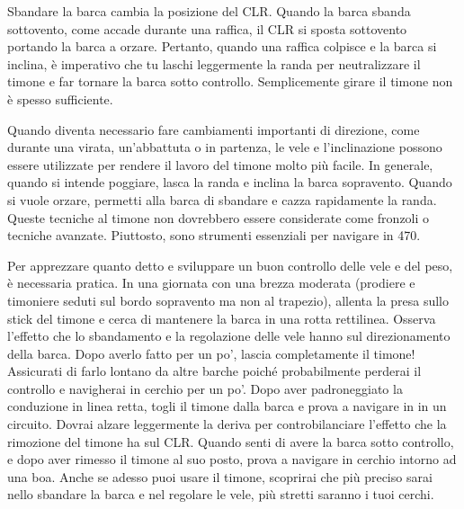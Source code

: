 Sbandare la barca cambia la posizione del CLR. Quando la barca sbanda
sottovento, come accade durante una raffica, il CLR si sposta sottovento
portando la barca a orzare. Pertanto, quando una raffica colpisce e la barca
si inclina, è imperativo che tu laschi leggermente la randa per neutralizzare il
timone e far tornare la barca sotto controllo. Semplicemente girare il timone
non è spesso sufficiente.

Quando diventa necessario fare cambiamenti importanti di
direzione, come durante una virata, un'abbattuta o in partenza,
le vele e l'inclinazione possono essere utilizzate per rendere il lavoro del
timone molto più facile. In generale, quando si intende poggiare, lasca la
randa e inclina la barca sopravento. Quando si vuole orzare, permetti
alla barca di sbandare e cazza rapidamente la randa. Queste tecniche al timone
non dovrebbero essere considerate come fronzoli o tecniche avanzate. Piuttosto,
sono strumenti essenziali per navigare in 470.

Per apprezzare quanto detto e sviluppare un buon controllo delle vele e del peso, è
necessaria pratica. In una giornata con una brezza moderata (prodiere e
timoniere seduti sul bordo sopravento ma non al trapezio), allenta la presa
sullo stick del timone e cerca di mantenere la barca in una rotta rettilinea.
Osserva l'effetto che lo sbandamento e la regolazione delle vele hanno sul
direzionamento della barca. Dopo averlo
fatto per un po', lascia completamente il timone! Assicurati di farlo lontano da
altre barche poiché probabilmente perderai il controllo e navigherai in cerchio
per un po'. Dopo aver padroneggiato la conduzione in linea retta, togli il timone dalla barca
e prova a navigare in in un circuito. Dovrai alzare leggermente la deriva per
controbilanciare l'effetto che la rimozione del timone ha sul CLR. Quando senti
di avere la barca sotto controllo, e dopo aver rimesso il timone al suo posto,
prova a navigare in cerchio intorno ad una boa. Anche se adesso puoi usare il
timone, scoprirai che più preciso sarai nello sbandare la barca e
nel regolare le vele, più stretti saranno i tuoi cerchi.


